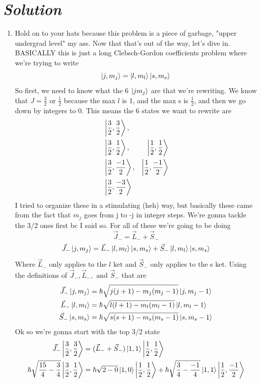 \documentclass{article}
\begin{document}
\section*{\textit{Solution}} 
\begin{enumerate}[label=\alph*)]
	\item %
	Hold on to your hats because this problem is a piece of garbage, "upper undergrad level" my ass. Now that that's out of the way, let's dive in. BASICALLY this is just a long Clebsch-Gordon coefficients problem where we're trying to write
	$$\ket{j, m_j} = \ket{l, m_l}\ket{s, m_s}$$
	So first, we need to know what the 6 $\ket{j m_j}$ are that we're rewriting. We know that $J = \frac{3}{2}\text{ or } \frac{1}{2}$ because the max $l$ is 1, and the max s is $\frac{1}{2}$, and then we go down by integers to 0. This means the 6 states we want to rewrite are
	\begin{align}
		&\ket{\frac{3}{2},\frac{3}{2}}, \\
		&\ket{\frac{3}{2},\frac{1}{2}}, &\ket{\frac{1}{2},\frac{1}{2}} \\
		&\ket{\frac{3}{2},\frac{-1}{2}}, &\ket{\frac{1}{2},\frac{-1}{2}} \\
		&\ket{\frac{3}{2},\frac{-3}{2}} 
	\end{align}
	I tried to organize these in a stimulating (heh) way, but basically these came from the fact that $m_j$ goes from j to -j in integer steps. We're gonna tackle the 3/2 ones first bc I said so. For all of these we're going to be doing 
	$$\vec{J}_- = \vec{L}_- + \vec{S}_-$$
	$$\vec{J}_-\ket{j, m_j} = \vec{L}_-\ket{l, m_l}\ket{s, m_s} + \vec{S}_-\ket{l, m_l}\ket{s, m_s}$$ 
	Where $\vec{L}_-$ only applies to the $l$ ket and $\vec{S}_-$ only applies to the s ket. Using the definitions of  $\vec{J}_-, \vec{L}_-, \text{ and } \vec{S}_-$ that are
	\begin{align}
		\vec{J}_-\ket{j, m_j} &= \hbar\sqrt{j(j+1) - m_j(m_j-1)} \ket{j, m_j-1} \\
		\vec{L}_-\ket{l, m_l} &= \hbar\sqrt{l(l+1) - m_l(m_l-1)} \ket{l, m_l-1} \\
		\vec{S}_-\ket{s, m_s} &= \hbar\sqrt{s(s+1) - m_s(m_s-1)} \ket{s, m_s-1} 
	\end{align}
	Ok so we're gonna start with the top 3/2 state
	\begin{align}
		\vec{J}_-\ket{\frac{3}{2}, \frac{3}{2}} &=  (\vec{L}_- +\vec{S}_-) \ket{1, 1}\ket{\frac{1}{2}, \frac{1}{2}} \\ 
		\hbar \sqrt{ \frac{15}{4} - \frac{3}{4}} \ket{\frac{3}{2}, \frac{1}{2}} &= \hbar \sqrt{2-0} \ket{1, 0}\ket{\frac{1}{2}, \frac{1}{2}} + \hbar \sqrt{\frac{3}{4} - \frac{-1}{4}} \ket{1, 1}\ket{\frac{1}{2}, \frac{-1}{2}} \\ 

\end{align}
\end{enumerate}
\end{document}
